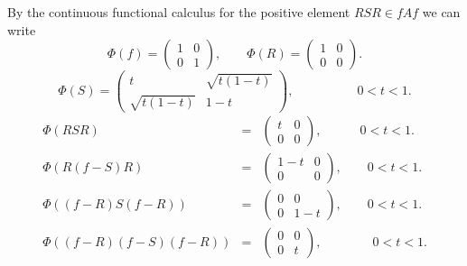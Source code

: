 \documentclass{amsart}
\theoremstyle{definition}
\begin{document}
By the continuous functional calculus for the positive element $RSR\in fAf$ we can write
$$\Phi(f)= \left(\begin{array}{cc}
  1  & 0   \\
  0 &  1   
\end{array}
\right),
\qquad \Phi(R)= \left(\begin{array}{cc}
  1  & 0   \\
  0 &  0   
\end{array}
\right).$$
$$
\Phi(S)=
\left(\begin{array}{cc}
  t  & \sqrt{t(1-t)}   \\
  \sqrt{t(1-t)} &  1-t   
\end{array}
\right),\qquad\qquad\quad  0<t<1.
$$
%
\begin{eqnarray*}
\Phi(RSR)&=&
\left(\begin{array}{cc}
  t  & 0   \\
  0 &  0   
\end{array}
\right),
\qquad\quad 0<t<1.
\\
%
\Phi(R(f-S)R)&=&
\left(\begin{array}{cc}
  1-t  & 0   \\
  0 &  0   
\end{array}
\right),\qquad 0<t<1.
\\
%
\Phi((f-R)S(f-R))&=&
\left(\begin{array}{cc}
  0  & 0   \\
  0 &  1-t   
\end{array}
\right),
\qquad 0<t<1.
\\
%
\Phi((f-R)(f-S)(f-R))&=&
\left(\begin{array}{cc}
  0  & 0   \\
  0 &  t   
\end{array}
\right),\qquad\qquad 0<t<1.
\end{eqnarray*}
\end{document}
